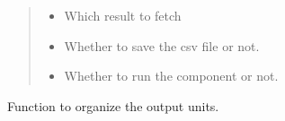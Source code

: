 \documentclass[letterpaper,10pt,english]{sphinxmanual}
\begin{document}
\begin{fulllineitems}
\begin{fulllineitems}
\begin{quote}
\begin{description}
\begin{itemize}
\item {} 
 \textendash{} Which result to fetch

\item {} 
 \textendash{} Whether to save the csv file or not.

\item {} 
 \textendash{} Whether to run the component or not.

\end{itemize}

\end{description}\end{quote}

\end{fulllineitems}


\begin{fulllineitems}
\label{\detokenize{cmf:livestock.components.comp_cmf.CMFResults.set_units}}
Function to organize the output units.

\end{fulllineitems}


\end{fulllineitems}

\end{document}
